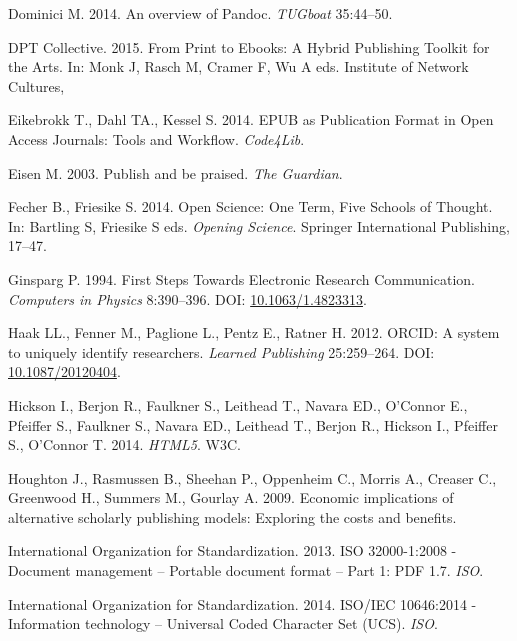 \documentclass[10pt,fleqn]{wlpeerj}
\begin{document}
\hypertarget{ref-dominiciux5fpandocux5f2014}{}
Dominici M. 2014. An overview of Pandoc. \emph{TUGboat} 35:44--50.

\hypertarget{ref-dptcollectiveux5ftoolkitux5f2015}{}
DPT Collective. 2015. From Print to Ebooks: A Hybrid Publishing Toolkit
for the Arts. In: Monk J, Rasch M, Cramer F, Wu A eds. Institute of
Network Cultures,

\hypertarget{ref-eikebrokkux5fepubux5f2014}{}
Eikebrokk T., Dahl TA., Kessel S. 2014. EPUB as Publication Format in
Open Access Journals: Tools and Workflow. \emph{Code4Lib}.

\hypertarget{ref-eisenux5fpublishux5f2003}{}
Eisen M. 2003. Publish and be praised. \emph{The Guardian}.

\hypertarget{ref-fecherux5fopenux5f2014}{}
Fecher B., Friesike S. 2014. Open Science: One Term, Five Schools of
Thought. In: Bartling S, Friesike S eds. \emph{Opening Science}.
Springer International Publishing, 17--47.

\hypertarget{ref-ginspargux5ffirstux5f1994}{}
Ginsparg P. 1994. First Steps Towards Electronic Research Communication.
\emph{Computers in Physics} 8:390--396. DOI:
\href{https://doi.org/10.1063/1.4823313}{10.1063/1.4823313}.

\hypertarget{ref-haakux5forcidux5f2012}{}
Haak LL., Fenner M., Paglione L., Pentz E., Ratner H. 2012. ORCID: A
system to uniquely identify researchers. \emph{Learned Publishing}
25:259--264. DOI:
\href{https://doi.org/10.1087/20120404}{10.1087/20120404}.

\hypertarget{ref-HTML5}{}
Hickson I., Berjon R., Faulkner S., Leithead T., Navara ED., O'Connor
E., Pfeiffer S., Faulkner S., Navara ED., Leithead T., Berjon R.,
Hickson I., Pfeiffer S., O'Connor T. 2014. \emph{HTML5}. W3C.

\hypertarget{ref-houghtonux5feconomicux5f2009}{}
Houghton J., Rasmussen B., Sheehan P., Oppenheim C., Morris A., Creaser
C., Greenwood H., Summers M., Gourlay A. 2009. Economic implications of
alternative scholarly publishing models: Exploring the costs and
benefits.

\hypertarget{ref-internationalux5forganizationux5fforux5fstandardizationux5fisoux5f2013}{}
International Organization for Standardization. 2013. ISO 32000-1:2008 -
Document management -- Portable document format -- Part 1: PDF 1.7.
\emph{ISO}.

\hypertarget{ref-internationalux5forganizationux5fforux5fstandardizationux5fisoux2fiecux5f2014}{}
International Organization for Standardization. 2014. ISO/IEC 10646:2014
- Information technology -- Universal Coded Character Set (UCS).
\emph{ISO}.
\end{document}
